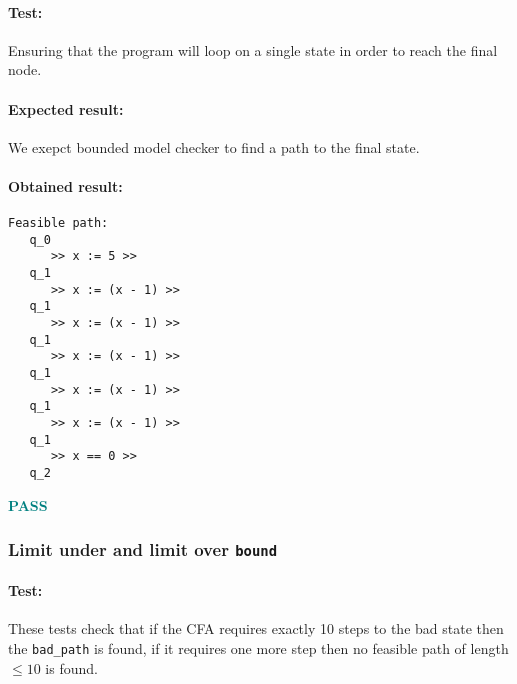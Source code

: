 \documentclass[letterpaper,12pt]{article}
\begin{document}
\paragraph{Test:}
Ensuring that the program will loop on a single state in order to reach the final node.
\paragraph{Expected result:}
We exepct bounded model checker to find a path to the final state.

\paragraph{Obtained result:}

\begin{verbatim}
Feasible path:
   q_0
      >> x := 5 >>
   q_1
      >> x := (x - 1) >>
   q_1
      >> x := (x - 1) >>
   q_1
      >> x := (x - 1) >>
   q_1
      >> x := (x - 1) >>
   q_1
      >> x := (x - 1) >>
   q_1
      >> x == 0 >>
   q_2

\end{verbatim}

\textbf{\textcolor{teal}{PASS}}

\subsubsection{Limit under and limit over \texttt{bound}}
\paragraph{Test:}
These tests check that if the CFA requires exactly 10 steps to the bad state then the \texttt{bad\_path} is found, if it requires one more step then no feasible path of length $\leq 10$ is found.
\end{document}
